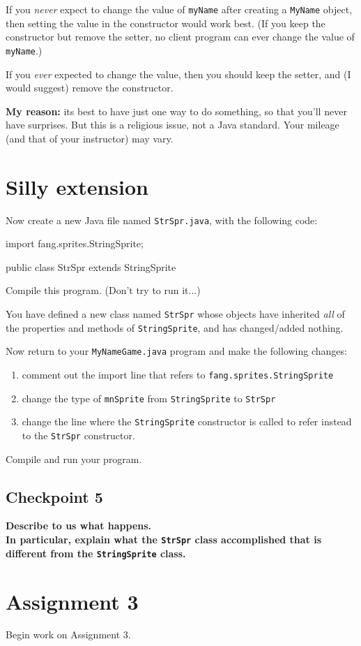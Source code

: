 \documentclass[12pt]{article}
\newenvironment{qv}%
  {\quote
   \verbatim}%
  {\endverbatim
   \endquote}
\newcommand{\code}{\texttt}
\begin{document}
If you \emph{never} expect to change the value of \code{myName} after
creating a \code{MyName} object, then setting the value in the
constructor would work best. (If you keep the constructor but remove
the setter, no client program can ever change the value of
\code{myName}.)

If you {\em ever} expected to change the value, then you should keep
the setter, and (I would suggest) remove the constructor.

\textbf{My reason:} its best to have just one way to do something, so
that you'll never have surprises.  But this is a religious issue, not
a Java standard. Your mileage (and that of your instructor) may vary.

\section*{Silly extension}
Now create a new Java file named \code{StrSpr.java}, with the
following code:

\begin{qv}
import fang.sprites.StringSprite;

public class StrSpr extends StringSprite {
}
\end{qv}

Compile this program.  (Don't try to run it...)

You have defined a new class named \code{StrSpr} whose objects have
inherited {\em all} of the properties and methods of
\code{StringSprite}, and has changed/added nothing.

Now return to your \code{MyNameGame.java} program
and make the following changes:

\begin{enumerate}
\item
  comment out the import line
  that refers to \code{fang.sprites.StringSprite}
\item
  change the type of \code{mnSprite}
  from \code{StringSprite} to \code{StrSpr}
\item
  change the line where the \code{StringSprite} constructor is called
  to refer instead to the \code{StrSpr} constructor.
\end{enumerate}

Compile and run your program.

\subsection*{Checkpoint 5}
{\bf
Describe to us what happens.\\
In particular,
explain what the \code{StrSpr} class accomplished that is different from
the \code{StringSprite} class.
}



\section*{Assignment 3}
Begin work on Assignment 3.
\end{document}
